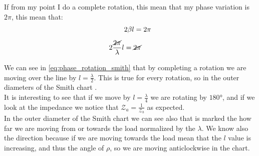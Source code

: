 If from my point I do a complete rotation, this mean that my phase variation is $2\pi$, this mean that:
\begin{align}
    \begin{split}
        &2\beta l=2\pi\\[5pt]
        2 \frac{\cancel{2\pi}}{\lambda}l&=\cancel{2\pi}\\[5pt]
    \end{split}\label{eq:phase_rotation_smith}
\end{align}
We can see in \cref{eq:phase_rotation_smith} that by completing a rotation we are moving over the line by $l=\frac{\lambda}{2}$. This is true for every rotation, so in the outer diameters of the Smith chart .\\
It is interesting to see that if we move by $l=\frac{\lambda}{4}$ we are rotating by $180\si{\degree}$, and if we look at the impedance we notice that $\mathcal{Z}_a=\frac{1}{\mathcal{Z}_b}$ as expected.\\
In the outer diameter of the Smith chart we can see also that is marked the how far we are moving from or towards the load normalized by the $\lambda$. We know also the direction because if we are moving towards the load mean that the $l$ value is increasing, and thus the angle of $\rho$, so we are moving anticlockwise in the chart.

